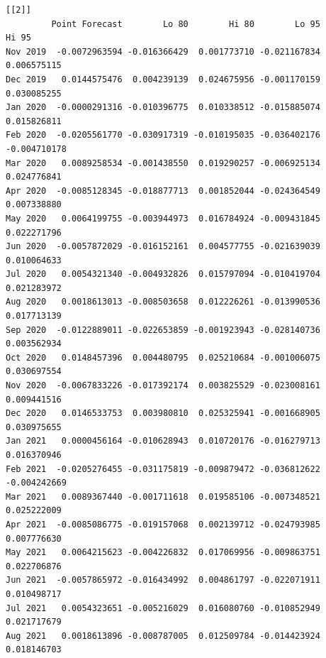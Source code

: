 \documentclass[
  number]{elsarticle}
\begin{document}
\begin{verbatim}
[[2]]
         Point Forecast        Lo 80        Hi 80        Lo 95        Hi 95
Nov 2019  -0.0072963594 -0.016366429  0.001773710 -0.021167834  0.006575115
Dec 2019   0.0144575476  0.004239139  0.024675956 -0.001170159  0.030085255
Jan 2020  -0.0000291316 -0.010396775  0.010338512 -0.015885074  0.015826811
Feb 2020  -0.0205561770 -0.030917319 -0.010195035 -0.036402176 -0.004710178
Mar 2020   0.0089258534 -0.001438550  0.019290257 -0.006925134  0.024776841
Apr 2020  -0.0085128345 -0.018877713  0.001852044 -0.024364549  0.007338880
May 2020   0.0064199755 -0.003944973  0.016784924 -0.009431845  0.022271796
Jun 2020  -0.0057872029 -0.016152161  0.004577755 -0.021639039  0.010064633
Jul 2020   0.0054321340 -0.004932826  0.015797094 -0.010419704  0.021283972
Aug 2020   0.0018613013 -0.008503658  0.012226261 -0.013990536  0.017713139
Sep 2020  -0.0122889011 -0.022653859 -0.001923943 -0.028140736  0.003562934
Oct 2020   0.0148457396  0.004480795  0.025210684 -0.001006075  0.030697554
Nov 2020  -0.0067833226 -0.017392174  0.003825529 -0.023008161  0.009441516
Dec 2020   0.0146533753  0.003980810  0.025325941 -0.001668905  0.030975655
Jan 2021   0.0000456164 -0.010628943  0.010720176 -0.016279713  0.016370946
Feb 2021  -0.0205276455 -0.031175819 -0.009879472 -0.036812622 -0.004242669
Mar 2021   0.0089367440 -0.001711618  0.019585106 -0.007348521  0.025222009
Apr 2021  -0.0085086775 -0.019157068  0.002139712 -0.024793985  0.007776630
May 2021   0.0064215623 -0.004226832  0.017069956 -0.009863751  0.022706876
Jun 2021  -0.0057865972 -0.016434992  0.004861797 -0.022071911  0.010498717
Jul 2021   0.0054323651 -0.005216029  0.016080760 -0.010852949  0.021717679
Aug 2021   0.0018613896 -0.008787005  0.012509784 -0.014423924  0.018146703
\end{verbatim}
\end{document}
